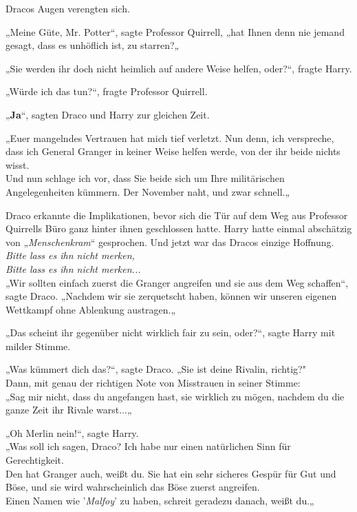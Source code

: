 {Dracos Augen verengten sich.

„Meine Güte, Mr. Potter“, sagte Professor Quirrell, „hat Ihnen denn nie jemand gesagt, dass es unhöflich ist, zu starren?„

„Sie werden ihr doch nicht heimlich auf andere Weise helfen, oder?“, fragte Harry.

„Würde ich das tun?“, fragte Professor Quirrell.

„\textbf{Ja}“, sagten Draco und Harry zur gleichen Zeit.

„Euer mangelndes Vertrauen hat mich tief verletzt. Nun denn, ich verspreche, dass ich General Granger in keiner Weise helfen werde, von der ihr beide nichts wisst.\\ Und nun schlage ich vor, dass Sie beide sich um Ihre militärischen Angelegenheiten kümmern. Der November naht, und zwar schnell.„

Draco erkannte die Implikationen, bevor sich die Tür auf dem Weg aus Professor Quirrells Büro ganz hinter ihnen geschlossen hatte. Harry hatte einmal abschätzig von „\emph{Menschenkram}“ gesprochen. Und jetzt war das Dracos einzige Hoffnung.\\ \emph{Bitte lass es ihn nicht merken,}\\ \emph{Bitte lass es ihn nicht merken...}\\ „Wir sollten einfach zuerst die Granger angreifen und sie aus dem Weg schaffen“, sagte Draco. „Nachdem wir sie zerquetscht haben, können wir unseren eigenen Wettkampf ohne Ablenkung austragen.„

„Das scheint ihr gegenüber nicht wirklich fair zu sein, oder?“, sagte Harry mit milder Stimme.

„Was kümmert dich das?“, sagte Draco. „Sie ist deine Rivalin, richtig?"\\ Dann, mit genau der richtigen Note von Misstrauen in seiner Stimme:\\ „Sag mir nicht, dass du angefangen hast, sie wirklich zu mögen, nachdem du die ganze Zeit ihr Rivale warst...„

„Oh Merlin nein!“, sagte Harry.\\ „Was soll ich sagen, Draco? Ich habe nur einen natürlichen Sinn für Gerechtigkeit.\\ Den hat Granger auch, weißt du. Sie hat ein sehr sicheres Gespür für Gut und Böse, und sie wird wahrscheinlich das Böse zuerst angreifen.\\ Einen Namen wie '\emph{Malfoy}' zu haben, schreit geradezu danach, weißt du.„

}
